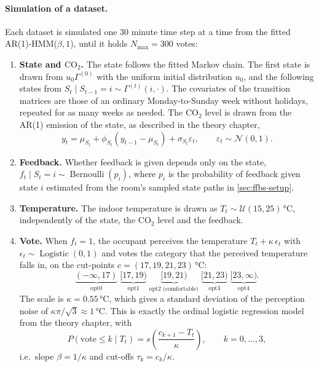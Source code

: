 \paragraph{Simulation of a dataset.}
Each dataset is simulated one 30 minute time step at a time from the fitted
AR(1)-HMM($\beta, 1$), until it holds $N_{\max} = 300$ votes:
\begin{enumerate}
    \item \textbf{State and $\text{CO}_2$.} The state follows the fitted Markov
    chain. The first state is drawn from $u_0 \Gamma^{(0)}$ with the uniform
    initial distribution $u_0$, and the following states from
    $S_t \mid S_{t-1} = i \sim \Gamma^{(t)}(i, \cdot)$. The covariates of the
    transition matrices are those of an ordinary Monday-to-Sunday week without
    holidays, repeated for as many weeks as needed. The $\text{CO}_2$ level is
    drawn from the AR(1) emission of the state, as described in the theory
    chapter,
    \begin{equation}
        y_t = \mu_{S_t} + \phi_{S_t} (y_{t-1} - \mu_{S_t}) + \sigma_{S_t} \varepsilon_t,
        \qquad \varepsilon_t \sim \mathcal{N}(0, 1).
    \end{equation}
    \item \textbf{Feedback.} Whether feedback is given depends only on the
    state, $f_t \mid S_t = i \sim \operatorname{Bernoulli}(p_i)$, where $p_i$ is
    the probability of feedback given state $i$ estimated from the room's
    sampled state paths in \cref{sec:ffbs-setup}.
    \item \textbf{Temperature.} The indoor temperature is drawn as
    $T_t \sim \mathcal{U}(15, 25)$\,°C, independently of the state, the
    $\text{CO}_2$ level and the feedback.
    \item \textbf{Vote.} When $f_t = 1$, the occupant perceives the temperature
    $T_t + \kappa\, \epsilon_t$ with $\epsilon_t \sim \operatorname{Logistic}(0, 1)$
    and votes the category that the perceived temperature falls in, on the
    cut-points $c = (17, 19, 21, 23)$\,°C:
    \begin{equation*}
        \underbrace{(-\infty, 17)}_{\text{opt0}} \;
        \underbrace{[17, 19)}_{\text{opt1}} \;
        \underbrace{[19, 21)}_{\text{opt2 (comfortable)}} \;
        \underbrace{[21, 23)}_{\text{opt3}} \;
        \underbrace{[23, \infty)}_{\text{opt4}}.
    \end{equation*}
    The scale is $\kappa = 0.55$\,°C, which gives a standard deviation of the
    perception noise of $\kappa \pi / \sqrt{3} \approx 1$\,°C. This is exactly
    the ordinal logistic regression model from the theory chapter, with
    \begin{equation}
        P(\text{vote} \leq k \mid T_t) = s\!\left( \frac{c_{k+1} - T_t}{\kappa} \right),
        \qquad k = 0, \dots, 3,
    \end{equation}
    i.e.\ slope $\beta = 1/\kappa$ and cut-offs $\tau_k = c_k / \kappa$.
\end{enumerate}
